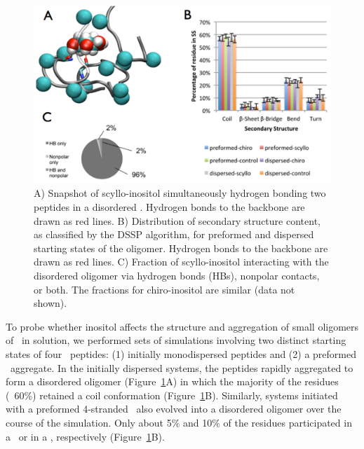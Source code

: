 \begin{figure}[htbp]
  \centering
  \includegraphics[width=6in]{figures/results1/GA4_paper_figures_submitted-4-rearranged}
  \caption[Binding of scyllo-inositol to the disordered oligomer of \gafour.]{A) Snapshot of scyllo-inositol simultaneously hydrogen bonding two peptides in a disordered \gafour\aggregate. Hydrogen bonds to the backbone are drawn as red lines. B) Distribution of secondary structure content, as classified by the DSSP algorithm, for preformed and dispersed starting states of the oligomer. Hydrogen bonds to the backbone are drawn as red lines. C) Fraction of scyllo-inositol interacting with the disordered oligomer via hydrogen bonds (HBs), nonpolar contacts, or both. The fractions for chiro-inositol are similar (data not shown).}
   \label{fig:figure4}
\end{figure}

To probe whether inositol affects the structure and aggregation of small oligomers of \gafour\ in solution, we performed sets of simulations involving two distinct starting states of four \gafour\ peptides: (1) initially monodispersed peptides and (2) a preformed \bsheet\ aggregate. In the initially dispersed systems, the peptides rapidly aggregated to form a disordered oligomer (Figure~\ref{fig:figure4}A) in which the majority of the residues (~60\%) retained a coil conformation (Figure~\ref{fig:figure4}B). Similarly, systems initiated with a preformed 4-stranded \bsheet\ also evolved into a disordered oligomer over the course of the simulation. Only about 5\% and 10\% of the residues participated in a \bsheet\ or in a \bbridge, respectively (Figure~\ref{fig:figure4}B).
	
